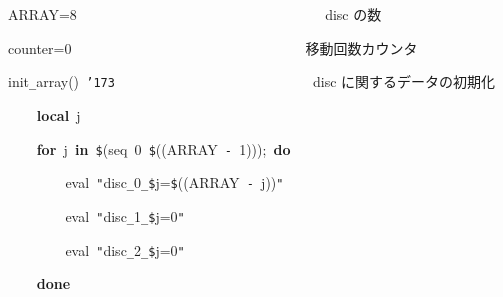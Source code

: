\documentclass[a4paper,10pt]{article}
\def\mc{\relax}
\begin{document}
\noindent
\mbox{}\hfill

\noindent
\mbox{}ARRAY=8{\tt\mc \ }{\tt\mc \ }{\tt\mc \ }{\tt\mc \ }{\tt\mc \ }{\tt\mc \ }{\tt\mc \ }{\tt\mc \ }{\tt\mc \ }{\tt\mc \ }{\tt\mc \ }{\tt\mc \ }{\tt\mc \ }{\tt\mc \ }{\tt\mc \ }{\tt\mc \ }{\tt\mc \ }{\tt\mc \ }{\tt\mc \ }{\tt\mc \ }{\tt\mc \ }{\tt\mc \ }{\tt\mc \ }{\tt\mc \ }{\tt\mc \ }{\tt\mc \ }{\tt\mc \ }{\tt\mc \ }{\tt\mc \ }{\tt\mc \ }{\tt\mc \ }{\tt\mc \ }{\tt\mc \ }\rm\mc {\tt\#} \ disc の数 \hfill 
\tt\mc 

\noindent
\mbox{}counter=0{\tt\mc \ }{\tt\mc \ }{\tt\mc \ }{\tt\mc \ }{\tt\mc \ }{\tt\mc \ }{\tt\mc \ }{\tt\mc \ }{\tt\mc \ }{\tt\mc \ }{\tt\mc \ }{\tt\mc \ }{\tt\mc \ }{\tt\mc \ }{\tt\mc \ }{\tt\mc \ }{\tt\mc \ }{\tt\mc \ }{\tt\mc \ }{\tt\mc \ }{\tt\mc \ }{\tt\mc \ }{\tt\mc \ }{\tt\mc \ }{\tt\mc \ }{\tt\mc \ }{\tt\mc \ }{\tt\mc \ }{\tt\mc \ }{\tt\mc \ }{\tt\mc \ }\rm\mc {\tt\#} \ 移動回数カウンタ \hfill 
\tt\mc 

\noindent
\mbox{}\hfill

\noindent
\mbox{}init{\tt\_}array(){\tt\mc \ }{\tt\char'173}{\tt\mc \ }{\tt\mc \ }{\tt\mc \ }{\tt\mc \ }{\tt\mc \ }{\tt\mc \ }{\tt\mc \ }{\tt\mc \ }{\tt\mc \ }{\tt\mc \ }{\tt\mc \ }{\tt\mc \ }{\tt\mc \ }{\tt\mc \ }{\tt\mc \ }{\tt\mc \ }{\tt\mc \ }{\tt\mc \ }{\tt\mc \ }{\tt\mc \ }{\tt\mc \ }{\tt\mc \ }{\tt\mc \ }{\tt\mc \ }{\tt\mc \ }{\tt\mc \ }\rm\mc {\tt\#} \ disc に関するデータの初期化\hfill 
\tt\mc 

\noindent
\mbox{}{\tt\mc \ }{\tt\mc \ }{\tt\mc \ }{\tt\mc \ }\textbf{local}{\tt\mc \ }j

\noindent
\mbox{}{\tt\mc \ }{\tt\mc \ }{\tt\mc \ }{\tt\mc \ }\textbf{for}{\tt\mc \ }j{\tt\mc \ }\textbf{in}{\tt\mc \ }{\tt\$}(seq{\tt\mc \ }0{\tt\mc \ }{\tt\$}((ARRAY{\tt\mc \ }{\tt -}{\tt\mc \ }1)));{\tt\mc \ }\textbf{do}

\noindent
\mbox{}{\tt\mc \ }{\tt\mc \ }{\tt\mc \ }{\tt\mc \ }{\tt\mc \ }{\tt\mc \ }{\tt\mc \ }{\tt\mc \ }eval{\tt\mc \ }{\tt "}disc{\tt\_}0{\tt\_}{\tt\$}j={\tt\$}((ARRAY{\tt\mc \ }{\tt -}{\tt\mc \ }j)){\tt "}

\noindent
\mbox{}{\tt\mc \ }{\tt\mc \ }{\tt\mc \ }{\tt\mc \ }{\tt\mc \ }{\tt\mc \ }{\tt\mc \ }{\tt\mc \ }eval{\tt\mc \ }{\tt "}disc{\tt\_}1{\tt\_}{\tt\$}j=0{\tt "}

\noindent
\mbox{}{\tt\mc \ }{\tt\mc \ }{\tt\mc \ }{\tt\mc \ }{\tt\mc \ }{\tt\mc \ }{\tt\mc \ }{\tt\mc \ }eval{\tt\mc \ }{\tt "}disc{\tt\_}2{\tt\_}{\tt\$}j=0{\tt "}

\noindent
\mbox{}{\tt\mc \ }{\tt\mc \ }{\tt\mc \ }{\tt\mc \ }\textbf{done}
\end{document}
